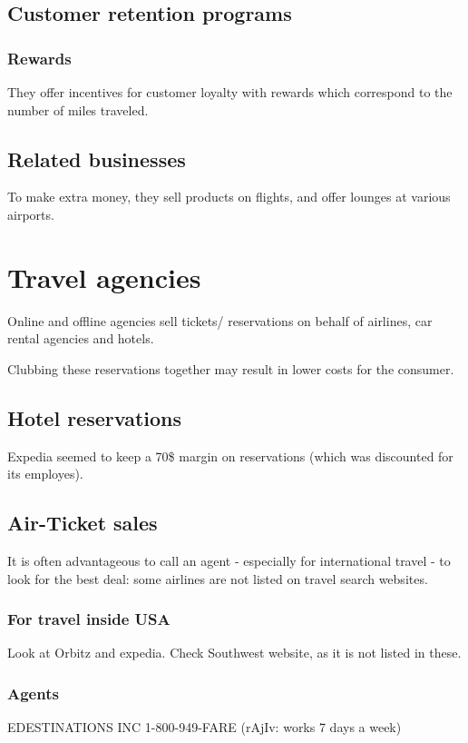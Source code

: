 \documentclass[oneside, article]{memoir}
\begin{document}
\section{Customer retention programs}
\subsection{Rewards}
They offer incentives for customer loyalty with rewards which correspond to the number of miles traveled.

\section{Related businesses}
To make extra money, they sell products on flights, and offer lounges at various airports.

\chapter{Travel agencies}
Online and offline agencies sell tickets/ reservations on behalf of airlines, car rental agencies and hotels.

Clubbing these reservations together may result in lower costs for the consumer.

\section{Hotel reservations}
Expedia seemed to keep a 70\$ margin on reservations (which was discounted for its employes).

\section{Air-Ticket sales}
It is often advantageous to call an agent - especially for international travel - to look for the best deal: some airlines are not listed on travel search websites.

\subsection{For travel inside USA}
Look at Orbitz and expedia. Check Southwest website, as it is not listed in these.

\subsection{Agents}
EDESTINATIONS INC
1-800-949-FARE (rAjIv: works 7 days a week)
\end{document}
